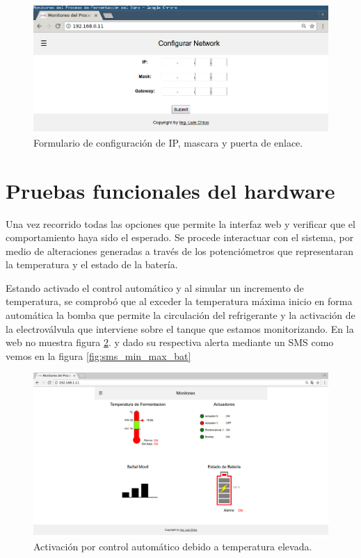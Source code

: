 \begin{figure}[h]
  \centering
  \includegraphics[scale=.25]{./Figures/config_network.png}
  \caption{Formulario de configuración de IP, mascara y puerta de enlace.}
  \label{fig:cfg_net}
\end{figure}




\section{Pruebas funcionales del hardware}
\label{sec:pruebasHW}

Una vez recorrido todas las opciones que permite la interfaz web y verificar que el comportamiento haya sido el esperado. Se procede interactuar con el sistema, por medio de alteraciones generadas a través de los potenciómetros que representaran la temperatura y el estado de la batería.

Estando activado el control automático y al simular un incremento de temperatura, se comprobó que al exceder la temperatura máxima inicio en forma automática la bomba que permite la circulación del refrigerante y la activación de la electroválvula que interviene sobre el tanque que estamos monitorizando. En la web no muestra figura \ref{fig:auto_control_active}. y dado su respectiva alerta mediante un SMS como vemos en la figura \ref{fig:sms_min_max_bat}

\begin{figure}[h]
  \centering
  \includegraphics[scale=.25]{./Figures/auto_control_active.png}
  \caption{Activación por control automático debido a temperatura elevada.}
  \label{fig:auto_control_active}
\end{figure}


